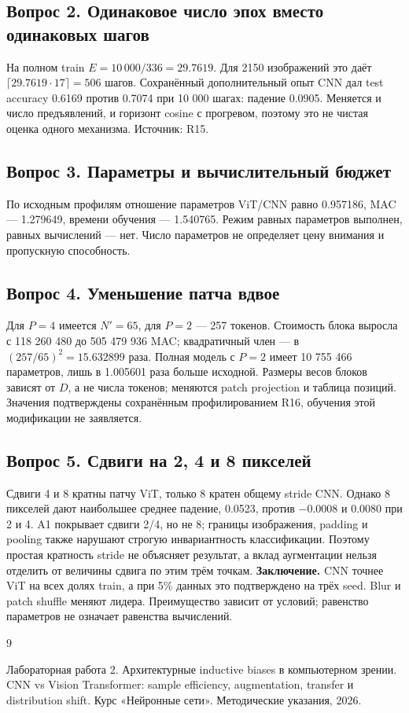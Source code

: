 \subsection*{Вопрос 2. Одинаковое число эпох вместо одинаковых шагов}
На полном train $E=10\,000/336=29.7619$. Для 2150 изображений это даёт $\lceil29.7619\cdot17\rceil=506$ шагов. Сохранённый дополнительный опыт CNN дал test accuracy 0.6169 против 0.7074 при 10 000 шагах: падение 0.0905. Меняется и число предъявлений, и горизонт cosine с прогревом, поэтому это не чистая оценка одного механизма. Источник: R15.
\subsection*{Вопрос 3. Параметры и вычислительный бюджет}
По исходным профилям отношение параметров ViT/CNN равно 0.957186, MAC --- 1.279649, времени обучения --- 1.540765. Режим равных параметров выполнен, равных вычислений --- нет. Число параметров не определяет цену внимания и пропускную способность.
\subsection*{Вопрос 4. Уменьшение патча вдвое}
Для $P=4$ имеется $N'=65$, для $P=2$ --- 257 токенов. Стоимость блока выросла с 118 260 480 до 505 479 936 MAC; квадратичный член --- в $(257/65)^2=15.632899$ раза. Полная модель с $P=2$ имеет 10 755 466 параметров, лишь в 1.005601 раза больше исходной. Размеры весов блоков зависят от $D$, а не числа токенов; меняются patch projection и таблица позиций. Значения подтверждены сохранённым профилированием R16, обучения этой модификации не заявляется.
\subsection*{Вопрос 5. Сдвиги на 2, 4 и 8 пикселей}


Сдвиги 4 и 8 кратны патчу ViT, только 8 кратен общему stride CNN. Однако 8 пикселей дают наибольшее среднее падение, 0.0523, против $-0.0008$ и 0.0080 при 2 и 4. A1 покрывает сдвиги 2/4, но не 8; границы изображения, padding и pooling также нарушают строгую инвариантность классификации. Поэтому простая кратность stride не объясняет результат, а вклад аугментации нельзя отделить от величины сдвига по этим трём точкам.
\noindent\textbf{Заключение.} CNN точнее ViT на всех долях train, а при 5\% данных это подтверждено на трёх seed. Blur и patch shuffle меняют лидера. Преимущество зависит от условий; равенство параметров не означает равенства вычислений.
\clearpage
\renewcommand{\refname}{Список использованных источников}
\begin{thebibliography}{9}
 Лабораторная работа 2. Архитектурные inductive biases в компьютерном зрении. CNN vs Vision Transformer: sample efficiency, augmentation, transfer и distribution shift. Курс «Нейронные сети». Методические указания, 2026.
\end{thebibliography}
\clearpage
